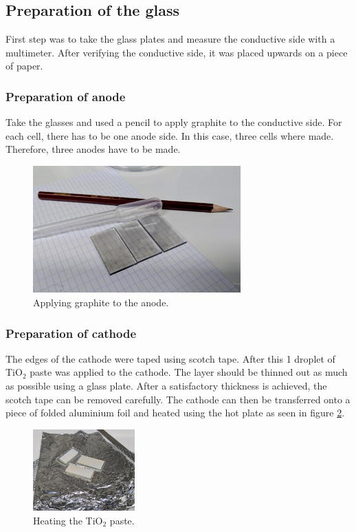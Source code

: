 \documentclass[conference]{IEEEtran}
\begin{document}
\subsection{Preparation of the glass}
First step was to take the glass plates and measure the conductive side with a multimeter. After verifying the conductive side, it was placed upwards on a piece of paper.

\subsubsection{Preparation of anode}
Take the glasses and used a pencil to apply graphite to the conductive side. For each cell, there has to be one anode side. In this case, three cells where made. Therefore, three anodes have to be made.

\begin{figure}[H]
\centering
\includegraphics[width=8.0cm]{4GraphiteLayer.jpg}
\caption{Applying graphite to the anode.}
\label{fig:graphitelayer} %
\end{figure}
\subsubsection{Preparation of cathode}
The edges of the cathode were taped using scotch tape. After this 1 droplet of TiO$_2$ paste was applied to the cathode. The layer should be thinned out as much as possible using a glass plate. After a satisfactory thickness is achieved, the scotch tape can be removed carefully. The cathode can then be transferred onto a piece of folded aluminium foil and heated using the hot plate as seen in figure \ref{fig:heatingti2o}.

\begin{figure}[H]
\centering
\includegraphics[width=0.35\textwidth]{2HeatedTiO.jpg}
\caption{Heating the TiO$_2$ paste.}
\label{fig:heatingti2o} %
\end{figure}
\end{document}
